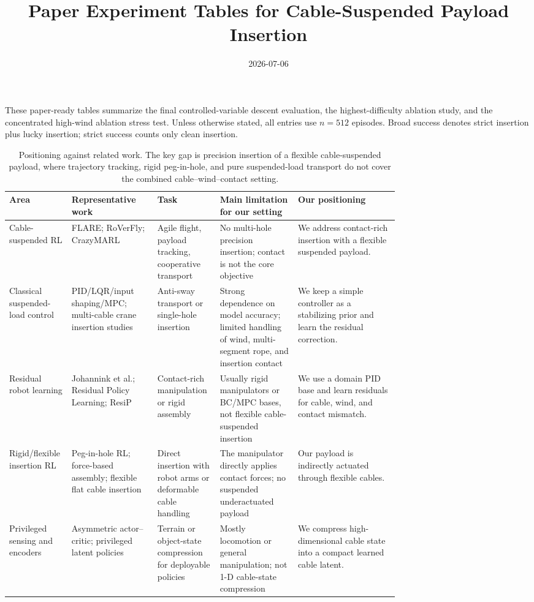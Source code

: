 \documentclass[10pt]{article}
\title{Paper Experiment Tables for Cable-Suspended Payload Insertion}
\author{}
\date{2026-07-06}
\begin{document}
\maketitle
\vspace{-1.5em}
\noindent
These paper-ready tables summarize the final controlled-variable descent
evaluation, the highest-difficulty ablation study, and the concentrated
high-wind ablation stress test.  Unless otherwise stated,
all entries use $n=512$ episodes.  Broad success denotes strict insertion plus
lucky insertion; strict success counts only clean insertion.

\begin{table}[t]
\centering
\caption{Positioning against related work.  The key gap is precision insertion of a flexible cable-suspended payload, where trajectory tracking, rigid peg-in-hole, and pure suspended-load transport do not cover the combined cable--wind--contact setting.}
\label{tab:related_work_positioning}
\footnotesize
\begin{tabularx}{\linewidth}{@{}p{0.16\linewidth}p{0.22\linewidth}p{0.16\linewidth}p{0.20\linewidth}Y@{}}
\toprule
Area & Representative work & Task & Main limitation for our setting & Our positioning \\
\midrule
Cable-suspended RL & FLARE; RoVerFly; CrazyMARL & Agile flight, payload tracking, cooperative transport & No multi-hole precision insertion; contact is not the core objective & We address contact-rich insertion with a flexible suspended payload. \\
Classical suspended-load control & PID/LQR/input shaping/MPC; multi-cable crane insertion studies & Anti-sway transport or single-hole insertion & Strong dependence on model accuracy; limited handling of wind, multi-segment rope, and insertion contact & We keep a simple controller as a stabilizing prior and learn the residual correction. \\
Residual robot learning & Johannink et al.; Residual Policy Learning; ResiP & Contact-rich manipulation or rigid assembly & Usually rigid manipulators or BC/MPC bases, not flexible cable-suspended insertion & We use a domain PID base and learn residuals for cable, wind, and contact mismatch. \\
Rigid/flexible insertion RL & Peg-in-hole RL; force-based assembly; flexible flat cable insertion & Direct insertion with robot arms or deformable cable handling & The manipulator directly applies contact forces; no suspended underactuated payload & Our payload is indirectly actuated through flexible cables. \\
Privileged sensing and encoders & Asymmetric actor--critic; privileged latent policies & Terrain or object-state compression for deployable policies & Mostly locomotion or general manipulation; not 1-D cable-state compression & We compress high-dimensional cable state into a compact learned cable latent. \\
\bottomrule
\end{tabularx}
\end{table}
\end{document}
